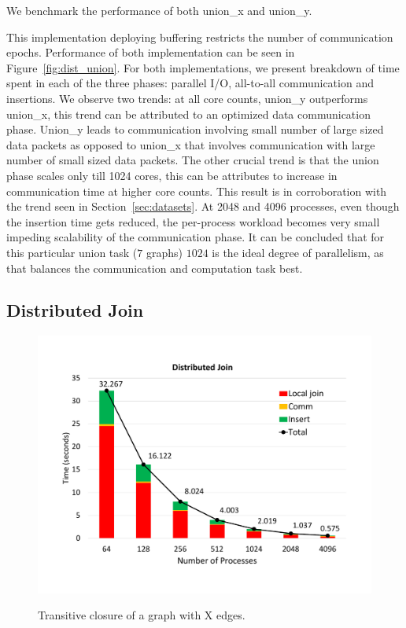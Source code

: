 We benchmark the performance of both union\_x and union\_y. 


 This implementation deploying buffering restricts the number of communication epochs. Performance of both implementation can be seen in Figure~\ref{fig:dist_union}. For both implementations, we present breakdown of time spent in each of the three phases: parallel I/O, all-to-all communication and insertions. We observe two trends: at all core counts, union\_y outperforms union\_x, this trend can be attributed to an optimized data communication phase. Union\_y leads to communication involving small number of large sized data packets as opposed to union\_x that involves communication with large number of small sized data packets. The other crucial trend is that the union phase scales only till 1024 cores, this can be attributes to increase in communication time at higher core counts. This result is in corroboration with the trend seen in Section~\ref{sec:datasets}. At 2048 and 4096 processes, even though the insertion time gets reduced, the per-process workload becomes very small impeding scalability of the communication phase. It can be concluded that for this particular union task ($7$ graphs) $1024$ is the ideal degree of parallelism, as that balances the communication and computation task best.




\subsection{Distributed Join}
\label{sec:join}

\begin{figure}[t]
	{\includegraphics[width=.50\textwidth,  trim={0cm 0cm 0cm 0cm, 
			clip}]{results/join.pdf}}\hfill%
	\centering
	\caption{Transitive closure of a graph with X edges.}
	\label{fig:dist_join}
\end{figure}


